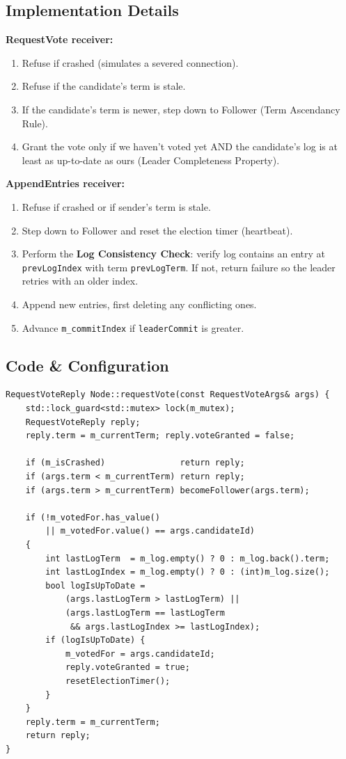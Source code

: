 \documentclass[11pt, a4paper]{article}
\begin{document}
\subsection{Implementation Details}
\textbf{RequestVote receiver:}
\begin{enumerate}[leftmargin=*]
    \item Refuse if crashed (simulates a severed connection).
    \item Refuse if the candidate's term is stale.
    \item If the candidate's term is newer, step down to Follower (Term
          Ascendancy Rule).
    \item Grant the vote only if we haven't voted yet AND the candidate's
          log is at least as up-to-date as ours (Leader Completeness
          Property).
\end{enumerate}

\textbf{AppendEntries receiver:}
\begin{enumerate}[leftmargin=*]
    \item Refuse if crashed or if sender's term is stale.
    \item Step down to Follower and reset the election timer (heartbeat).
    \item Perform the \textbf{Log Consistency Check}: verify log contains
          an entry at \texttt{prevLogIndex} with term \texttt{prevLogTerm}.
          If not, return failure so the leader retries with an older index.
    \item Append new entries, first deleting any conflicting ones.
    \item Advance \texttt{m\_commitIndex} if \texttt{leaderCommit} is greater.
\end{enumerate}

\subsection{Code \& Configuration}
\begin{lstlisting}[style=cppstyle, caption={Node.cpp --- requestVote()}]
RequestVoteReply Node::requestVote(const RequestVoteArgs& args) {
    std::lock_guard<std::mutex> lock(m_mutex);
    RequestVoteReply reply;
    reply.term = m_currentTerm; reply.voteGranted = false;

    if (m_isCrashed)               return reply;
    if (args.term < m_currentTerm) return reply;
    if (args.term > m_currentTerm) becomeFollower(args.term);

    if (!m_votedFor.has_value()
        || m_votedFor.value() == args.candidateId)
    {
        int lastLogTerm  = m_log.empty() ? 0 : m_log.back().term;
        int lastLogIndex = m_log.empty() ? 0 : (int)m_log.size();
        bool logIsUpToDate =
            (args.lastLogTerm > lastLogTerm) ||
            (args.lastLogTerm == lastLogTerm
             && args.lastLogIndex >= lastLogIndex);
        if (logIsUpToDate) {
            m_votedFor = args.candidateId;
            reply.voteGranted = true;
            resetElectionTimer();
        }
    }
    reply.term = m_currentTerm;
    return reply;
}
\end{lstlisting}
\end{document}
